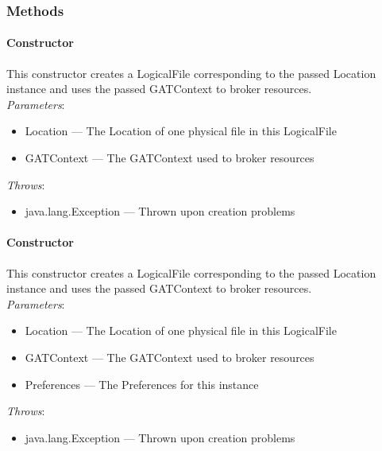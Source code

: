 \documentclass[$Date: 2003/06/26 19:29:31 $]{glabarticle}
\begin{document}

\subsubsection{Methods}

\paragraph{Constructor}

This constructor creates a LogicalFile corresponding to the passed
Location instance and uses the passed GATContext to broker
resources. \\

\textit{Parameters}:
\begin{itemize}
\item[] Location --- The Location of one physical file in this LogicalFile
\item[] GATContext --- The GATContext used to broker resources
\end{itemize}

 \textit{Throws}:
 \begin{itemize}
 \item[] java.lang.Exception --- Thrown upon creation problems 
 \end{itemize}
 
\paragraph{Constructor}

This constructor creates a LogicalFile corresponding to the passed
Location instance and uses the passed GATContext to broker
resources. \\

\textit{Parameters}:
\begin{itemize}
\item[] Location --- The Location of one physical file in this LogicalFile
\item[] GATContext --- The GATContext used to broker resources
\item[] Preferences --- The Preferences for this instance
\end{itemize}

 \textit{Throws}:
 \begin{itemize}
 \item[] java.lang.Exception --- Thrown upon creation problems 
 \end{itemize}
\end{document}
